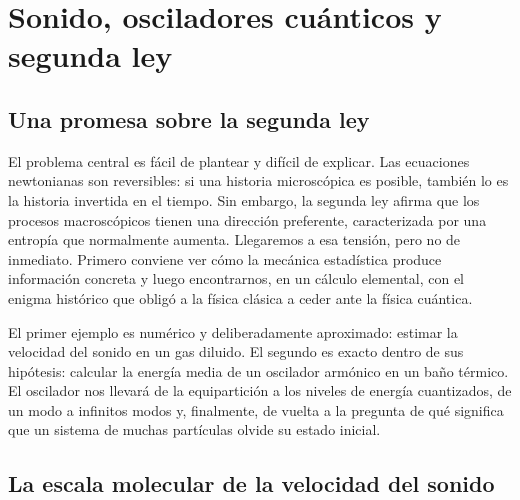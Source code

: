 \chapter{Sonido, osciladores cuánticos y segunda ley}


\section{Una promesa sobre la segunda ley}

El problema central es fácil de plantear y difícil de explicar. Las ecuaciones newtonianas son reversibles: si una historia microscópica es posible, también lo es la historia invertida en el tiempo. Sin embargo, la segunda ley afirma que los procesos macroscópicos tienen una dirección preferente, caracterizada por una entropía que normalmente aumenta. Llegaremos a esa tensión, pero no de inmediato. Primero conviene ver cómo la mecánica estadística produce información concreta y luego encontrarnos, en un cálculo elemental, con el enigma histórico que obligó a la física clásica a ceder ante la física cuántica.

El primer ejemplo es numérico y deliberadamente aproximado: estimar la velocidad del sonido en un gas diluido. El segundo es exacto dentro de sus hipótesis: calcular la energía media de un oscilador armónico en un baño térmico. El oscilador nos llevará de la equipartición a los niveles de energía cuantizados, de un modo a infinitos modos y, finalmente, de vuelta a la pregunta de qué significa que un sistema de muchas partículas olvide su estado inicial.

\section{La escala molecular de la velocidad del sonido}

